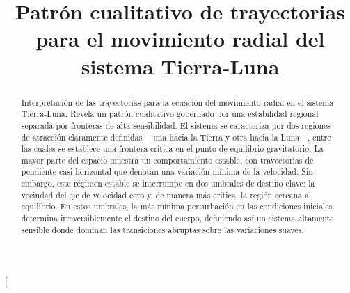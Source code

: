 \documentclass[a4paper,10pt,twocolumn]{article}
\title{Patrón cualitativo de trayectorias para el movimiento radial del sistema Tierra-Luna}
\begin{document}
\twocolumn[

\maketitle


\begin{abstract}

	Interpretación de las trayectorias para la ecuación del movimiento radial en el sistema Tierra-Luna. Revela un patrón cualitativo gobernado por una estabilidad regional separada por fronteras de alta sensibilidad. El sistema se caracteriza por dos regiones de atracción claramente definidas —una hacia la Tierra y otra hacia la Luna—, entre las cuales se establece una frontera crítica en el punto de equilibrio gravitatorio. La mayor parte del espacio muestra un comportamiento estable, con trayectorias de pendiente casi horizontal que denotan una variación mínima de la velocidad. Sin embargo, este régimen estable se interrumpe en dos umbrales de destino clave: la vecindad del eje de velocidad cero y, de manera más crítica, la región cercana al equilibrio. En estos umbrales, la más mínima perturbación en las condiciones iniciales determina irreversiblemente el destino del cuerpo, definiendo así un sistema altamente sensible donde dominan las transiciones abruptas sobre las variaciones suaves.

\end{abstract}


\vspace{0.5cm}
\end{document}
